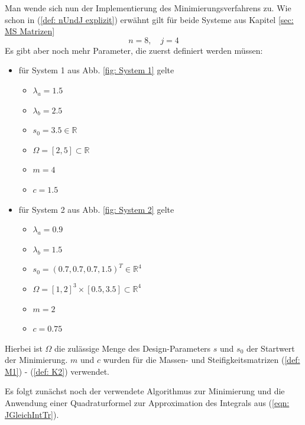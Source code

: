 \documentclass[a4paper,12pt]{report}
\newcommand{\R}{\mathbb R}
\newcommand{\1}{\mathds{1}}
\theoremstyle{plain} %
\theoremstyle{definition} %
\theoremstyle{remark}
\begin{document}
      Man wende sich nun der Implementierung des Minimierungsverfahrens zu.
      Wie schon in (\ref{def: nUndJ explizit}) erwähnt gilt für beide Systeme aus Kapitel \ref{sec: MS Matrizen}
      $$n=8,\quad j=4$$
      Es gibt aber noch mehr Parameter, die zuerst definiert werden müssen:
      \begin{itemize}
            \item für System 1 aus Abb. \ref{fig: System 1} gelte
            \begin{itemize}
                  \item $\lambda_a = 1.5$
                  \item $\lambda_b = 2.5$
                  \item $s_0 = 3.5\in\R$
                  \item $\Omega = [2,5]\subset \R$
                  \item $m = 4$
                  \item $c = 1.5$
            \end{itemize}
            \item für System 2 aus Abb. \ref{fig: System 2} gelte
            \begin{itemize}
                  \item $\lambda_a = 0.9$
                  \item $\lambda_b = 1.5$
                  \item $s_0 = (0.7, 0.7, 0.7, 1.5)^T\in \R^4$
                  \item $\Omega = [1,2]^3\times [0.5,3.5]\subset \R^4$
                  \item $m = 2$
                  \item $c = 0.75$
            \end{itemize}
      \end{itemize}

      Hierbei ist $\Omega$ die zulässige Menge des Design-Parameters $s$ und $s_0$ der Startwert der Minimierung.
      $m$ und $c$ wurden für die Massen- und Steifigkeitsmatrizen (\ref{def: M1}) - (\ref{def: K2}) verwendet.


      Es folgt zunächst noch der verwendete Algorithmus zur Minimierung und die Anwendung einer Quadraturformel
      zur Approximation des Integrals aus (\ref{eqn: JGleichIntTr}).
\end{document}

